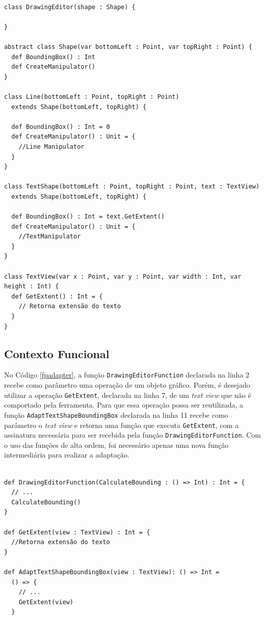 \begin{lstlisting}[caption={\textit{Adapter} Orientado a Objetos.},label=ooadapter]

class DrawingEditor(shape : Shape) {

}

abstract class Shape(var bottomLeft : Point, var topRight : Point) {
  def BoundingBox() : Int
  def CreateManipulator()
}

class Line(bottomLeft : Point, topRight : Point)
  extends Shape(bottomLeft, topRight) {

  def BoundingBox() : Int = 0
  def CreateManipulator() : Unit = {
    //Line Manipulator
  }
}

class TextShape(bottomLeft : Point, topRight : Point, text : TextView)
  extends Shape(bottomLeft, topRight) {

  def BoundingBox() : Int = text.GetExtent()
  def CreateManipulator() : Unit = {
    //TextManipulator
  }
}

class TextView(var x : Point, var y : Point, var width : Int, var height : Int) {
  def GetExtent() : Int = {
    // Retorna extensão do texto
  }
}

\end{lstlisting}

\subsection*{Contexto Funcional}

No Código \ref{fpadapter}, a função \texttt{DrawingEditorFunction} 
declarada na linha 2 recebe como parâmetro uma operação de um 
objeto gráfico. Porém, é desejado utilizar a operação 
\texttt{GetExtent}, declarada na linha 7, de um \textit{text view} 
que não é comportado pela ferramenta. Para que essa 
operação possa ser reutilizada, a função 
\texttt{AdaptTextShapeBoundingBox} declarada na linha 11 
recebe como parâmetro o \textit{text view} e retorna 
uma função que executa \texttt{GetExtent}, com a assinatura 
necessária para ser recebida pela função 
\texttt{DrawingEditorFunction}. Com o uso das funções de alta 
ordem, foi necessário apenas uma nova função intermediária 
para realizar a adaptação. 

\begin{lstlisting}[caption={\textit{Adapter} Funcional.},label=fpadapter]
    
def DrawingEditorFunction(CalculateBounding : () => Int) : Int = {
  // ...
  CalculateBounding()
}

def GetExtent(view : TextView) : Int = {
  //Retorna extensão do texto
}

def AdaptTextShapeBoundingBox(view : TextView): () => Int =
  () => {
    // ...
    GetExtent(view)
  }

\end{lstlisting}
